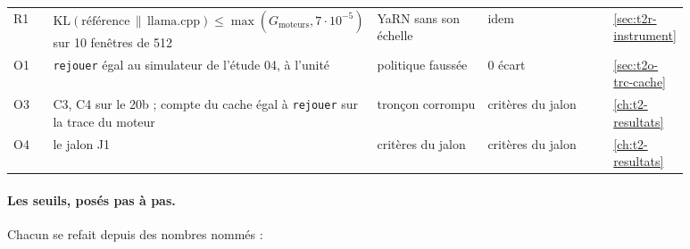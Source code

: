 \begin{longtable}{@{}p{0.07\linewidth}p{0.26\linewidth}p{0.21\linewidth}p{0.26\linewidth}p{0.08\linewidth}@{}}
R1 & $\mathrm{KL}(\text{référence} \,\|\, \text{llama.cpp}) \le \max(G_{\text{moteurs}}, 7 \cdot 10^{-5})$ sur 10 fenêtres de 512 & YaRN sans son échelle & idem & \cref{sec:t2r-instrument} \\
O1 & \texttt{rejouer} égal au simulateur de l'étude 04, à l'unité & politique faussée & 0 écart & \cref{sec:t2o-trc-cache} \\
O3 & C3, C4 sur le 20b ; compte du cache égal à \texttt{rejouer} sur la trace du moteur & tronçon corrompu & critères du jalon & \cref{ch:t2-resultats} \\
O4 & le jalon J1 & critères du jalon & critères du jalon & \cref{ch:t2-resultats} \\
\bottomrule
\end{longtable}
\endgroup

\paragraph{Les seuils, posés pas à pas.} Chacun se refait depuis des nombres nommés \calc :
